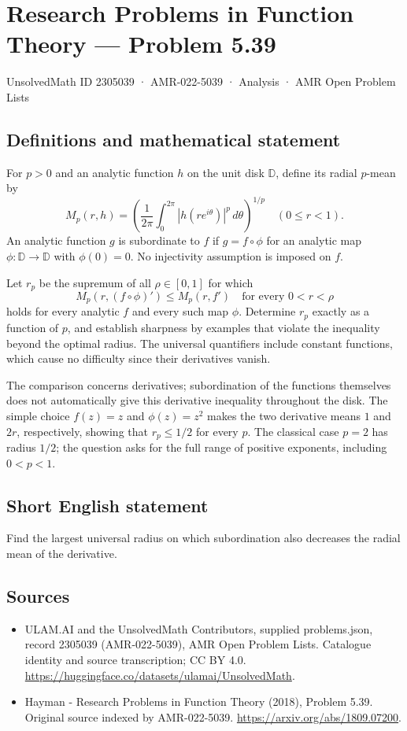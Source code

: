 \documentclass[11pt,a4paper]{article}
\begin{document}
\section*{Research Problems in Function Theory — Problem 5.39}\label{2305039}
{\small UnsolvedMath ID 2305039 · AMR-022-5039 · Analysis · AMR Open Problem Lists}
\subsection{Definitions and mathematical statement}
For $p>0$ and an analytic function $h$ on the unit disk
$\mathbb D$, define its radial $p$-mean by
\[
 M_p(r,h)=\left(\frac1{2\pi}\int_0^{2\pi}
                     |h(re^{i\theta})|^p\,d\theta\right)^{1/p}
 \quad(0\leq r<1).
\]
An analytic function $g$ is subordinate to $f$ if
$g=f\circ\phi$ for an analytic map $\phi:\mathbb D\to\mathbb D$
with $\phi(0)=0$. No injectivity assumption is imposed on $f$.

Let $r_p$ be the supremum of all $\rho\in[0,1]$ for which
\[
 M_p(r,(f\circ\phi)')\leq M_p(r,f')
 \quad\text{for every }0<r<\rho
\]
holds for every analytic $f$ and every such map $\phi$.
Determine $r_p$ exactly as a function of $p$, and establish
sharpness by examples that violate the inequality beyond the
optimal radius. The universal quantifiers include constant
functions, which cause no difficulty since their derivatives vanish.

The comparison concerns derivatives; subordination of the functions
themselves does not automatically give this derivative inequality
throughout the disk. The simple choice $f(z)=z$ and $\phi(z)=z^2$
makes the two derivative means $1$ and $2r$, respectively,
showing that $r_p\leq1/2$ for every $p$. The classical case
$p=2$ has radius $1/2$; the question asks for the full range
of positive exponents, including $0<p<1$.
\subsection{Short English statement}
Find the largest universal radius on which subordination also decreases the radial mean of the derivative.
\subsection{Sources}
\begin{itemize}
\item[S1] ULAM.AI and the UnsolvedMath Contributors, supplied problems.json, record 2305039 (AMR-022-5039), AMR Open Problem Lists. Catalogue identity and source transcription; CC BY 4.0.
\url{https://huggingface.co/datasets/ulamai/UnsolvedMath}.
\item[S2] Hayman - Research Problems in Function Theory (2018), Problem 5.39. Original source indexed by AMR-022-5039.
\url{https://arxiv.org/abs/1809.07200}.
\end{itemize}
\end{document}
